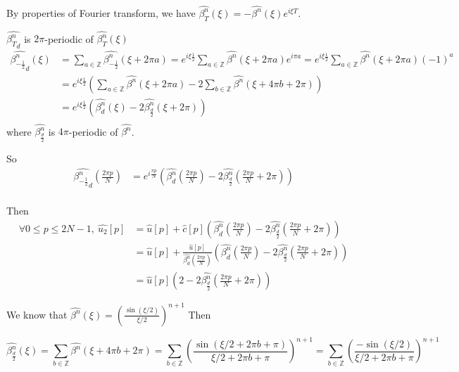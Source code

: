 \documentclass{article}
\begin{document}
	By properties of Fourier transform, we have $\hat{\beta^n_T}(\xi) =-\hat{\beta^n}(\xi)e^{i\xi T}$.
	
	$\widehat{{\beta^n_T}_d}$ is $2\pi$-periodic of $\hat{\beta^n_T}(\xi)$
	\begin{equation*}
	\begin{split}
	\widehat{{\beta^n_{-\frac{1}{2}}}_d}(\xi) &=\sum_{a\in\mathbb{Z}} \hat{\beta^n_{-\frac{1}{2}}}(\xi+2\pi a) = e^{i\xi \frac{1}{2}} \sum_{a\in\mathbb{Z}}  \hat{\beta^n}(\xi+2\pi a)  e^{i \pi a}= e^{i\xi \frac{1}{2}} \sum_{a\in\mathbb{Z}}  \hat{\beta^n}(\xi+2\pi a)  (-1)^a\\
	&=e^{i\xi \frac{1}{2}} (\sum_{a\in\mathbb{Z}}  \hat{\beta^n}(\xi+2\pi a) - 2 \sum_{b\in\mathbb{Z}}  \hat{\beta^n}(\xi+4\pi b+2\pi))\\
	&=e^{i\xi \frac{1}{2}} (\hat{\beta^n_d}(\xi) - 2 \hat{\beta^n_{\frac{d}{2}}}(\xi + 2\pi))\\
	\end{split}
	\end{equation*}
	where $\hat{\beta^n_{\frac{d}{2}}}$ is $4\pi$-periodic of $\hat{\beta^n}$.
	
	So
	\begin{equation*}
	\begin{split}
	\widehat{{\beta^n_{-\frac{1}{2}}}_d}(\frac{2\pi p}{N}) &=e^{i\frac{\pi p}{N}} (\hat{\beta^n_d}(\frac{2\pi p}{N}) - 2 \hat{\beta^n_{\frac{d}{2}}}(\frac{2\pi p}{N} + 2\pi))\\
	\end{split}
	\end{equation*}
	
	Then
	\begin{equation*}
	\begin{split}
	\forall 0\leq p\leq 2N-1,\ \hat{u_2}[p]&=\hat{u}[p] + \hat{c}[p] (\hat{\beta^n_d}(\frac{2\pi p}{N}) - 2 \hat{\beta^n_{\frac{d}{2}}}(\frac{2\pi p}{N} + 2\pi))  \\
	&=\hat{u}[p] + \frac{\hat{u}[p]}{\hat{\beta^n_d}(\frac{2\pi p}{N})}  (\hat{\beta^n_d}(\frac{2\pi p}{N}) - 2 \hat{\beta^n_{\frac{d}{2}}}(\frac{2\pi p}{N} + 2\pi))  \\
	&= \hat{u}[p] (2- 2 \hat{\beta^n_{\frac{d}{2}}}(\frac{2\pi p}{N} + 2\pi))
	\end{split}
	\end{equation*}
	
	We know that $\hat{\beta^n}(\xi) = (\frac{\sin (\xi/2)}{\xi/2})^{n+1}$
	Then
	
	\begin{equation*}
	\hat{\beta^n_{\frac{d}{2}}}(\xi) = \sum_{b\in\mathbb{Z}}  \hat{\beta^n}(\xi+4\pi b+2\pi) = \sum_{b\in\mathbb{Z}}  (\frac{\sin (\xi/2 +2\pi b +\pi)}{\xi/2 +2\pi b +\pi})^{n+1}= \sum_{b\in\mathbb{Z}}  (\frac{-\sin (\xi/2)}{\xi/2 +2\pi b +\pi})^{n+1}
	\end{equation*}
\end{document}
